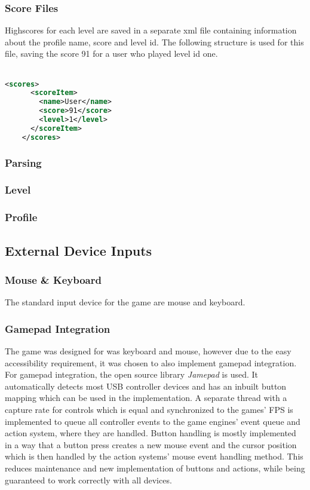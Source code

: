 \subsubsection{Score Files}\label{subsubsec:score-files}
Highscores for each level are saved in a separate xml file containing information about the profile name, score and level id.
The following structure is used for this file, saving the score 91 for a user who played level id one.
\\ \\
\begin{lstlisting}[language=XML,label={lst:score-xml}]
    <scores>
      <scoreItem>
        <name>User</name>
        <score>91</score>
        <level>1</level>
      </scoreItem>
    </scores>
\end{lstlisting}

\subsubsection{Parsing}\label{subsubsec:parsing}

\subsubsection{Level}
\subsubsection{Profile}
\subsection{External Device Inputs}\label{subsec:external-device-inputs}
\subsubsection{Mouse \& Keyboard}\label{subsubsec:mouse-&-keyboard}
The standard input device for the game are mouse and keyboard.
\subsubsection{Gamepad Integration}\label{subsubsec:gamepad-integration}
The game was designed for was keyboard and mouse, however due to the easy accessibility requirement, it was chosen to also implement gamepad integration.
For gamepad integration, the open source library \textit{Jamepad} is used.
It automatically detects most USB controller devices and has an inbuilt button mapping which can be used in the implementation.
A separate thread with a capture rate for controls which is equal and synchronized to the games' FPS is implemented to queue all controller
events to the game engines' event queue and action system, where they are handled.
Button handling is mostly implemented in a way that a button press creates a new mouse event and the cursor position which is then handled by the action
systems' mouse event handling method.
This reduces maintenance and new implementation of buttons and actions, while being guaranteed to work correctly with all devices.

